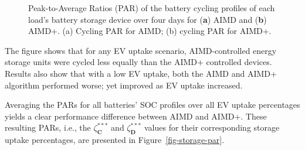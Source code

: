 \begin{figure}\centering
 \caption{Peak-to-Average Ratios (PAR) of the battery cycling profiles of each load's battery storage device over four days for (\textbf{a}) AIMD  and (\textbf{b}) AIMD+. ({a}) Cycling PAR for AIMD; ({b}) cycling PAR for AIMD+.}
 \label{fig-storage-par-large}
\end{figure}

The figure shows that for any EV uptake scenario, AIMD-controlled energy storage units were cycled less equally than the AIMD+ controlled devices. Results also show that with a low EV uptake, both the AIMD and AIMD+ algorithm performed worse; yet improved as EV uptake increased.

Averaging the PARs for all batteries' SOC profiles over all EV uptake percentages yields a clear performance difference between AIMD and AIMD+. These resulting PARs, i.e., the $\zeta_\textbf{C}^{***}$ and $\zeta_\textbf{D}^{***}$ values for their corresponding storage uptake percentages, are presented in Figure~\ref{fig-storage-par}.

